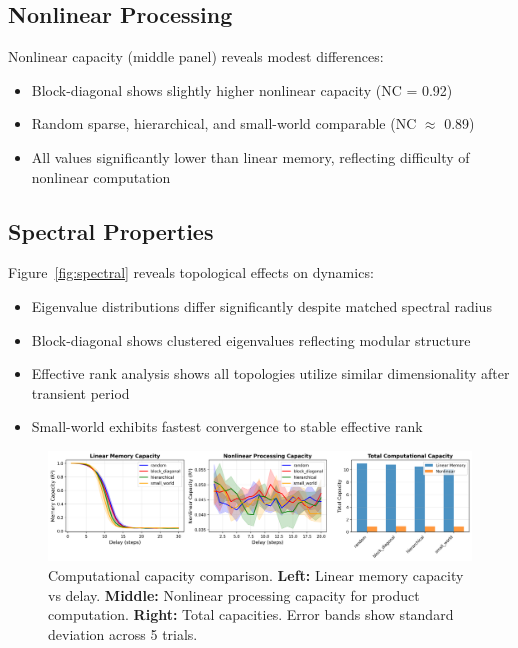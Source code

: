 \documentclass[11pt]{article}
\begin{document}
\subsection{Nonlinear Processing}

Nonlinear capacity (middle panel) reveals modest differences:

\begin{itemize}
\item Block-diagonal shows slightly higher nonlinear capacity (NC = 0.92)
\item Random sparse, hierarchical, and small-world comparable (NC $\approx$ 0.89)
\item All values significantly lower than linear memory, reflecting difficulty of nonlinear computation
\end{itemize}

\subsection{Spectral Properties}

Figure~\ref{fig:spectral} reveals topological effects on dynamics:

\begin{itemize}
\item Eigenvalue distributions differ significantly despite matched spectral radius
\item Block-diagonal shows clustered eigenvalues reflecting modular structure
\item Effective rank analysis shows all topologies utilize similar dimensionality after transient period
\item Small-world exhibits fastest convergence to stable effective rank
\end{itemize}

\begin{figure}[t]
\centering
\includegraphics[width=\textwidth]{capacity_comparison.png}
\caption{Computational capacity comparison. \textbf{Left:} Linear memory capacity vs delay. \textbf{Middle:} Nonlinear processing capacity for product computation. \textbf{Right:} Total capacities. Error bands show standard deviation across 5 trials.}
\label{fig:capacity}
\end{figure}
\end{document}
